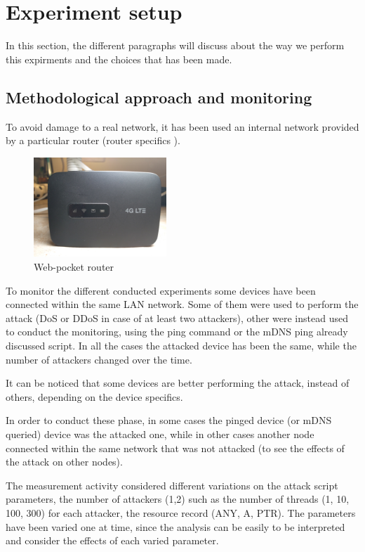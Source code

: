 \documentclass[fleqn, 11pt]{SelfArx} %
\begin{document}
\section{Experiment setup}
In this section, the different paragraphs will discuss about the way we perform this expirments and the choices that has been made.
\subsection{Methodological approach and monitoring}
To avoid damage to a real network, it has been used an internal network provided by a particular router (router specifics \cite{RouterSpecs}).

\begin{figure}[H]\centering
    \includegraphics[width=5cm]{./router.jpg}
    \caption{Web-pocket router}
\end{figure}

To monitor the different conducted experiments some devices have been connected within the same LAN network.
Some of them were used to perform the attack (DoS or DDoS in case of at least two attackers), other were instead used to conduct the monitoring,
using the ping command or the mDNS ping already discussed script. 
In all the cases the attacked device has been the same, while the number of attackers changed over the time.

It can be noticed that some devices are better performing the attack, instead of others, depending on the device specifics.

In order to conduct these phase, in some cases the pinged device (or mDNS queried) device was the attacked one, while in other cases
another node connected within the same network that was not attacked (to see the effects of the attack on other nodes).
\newline

The measurement activity considered different variations on the attack script parameters, the number of attackers (1,2) such as the number of threads (1, 10, 100, 300) for each attacker,
the resource record (ANY, A, PTR).
The parameters have been varied one at time, since the analysis can be easily to be interpreted and consider the effects of each varied parameter.
\newline
\end{document}
